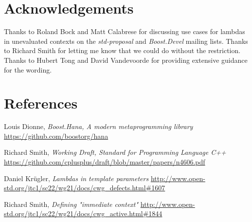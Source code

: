 \documentclass{wg21}
\begin{document}
\section{Acknowledgements}
Thanks to Roland Bock and Matt Calabrese for discussing use cases for lambdas
in unevaluated contexts on the \textit{std-proposal} and \textit{Boost.Devel}
mailing lists. Thanks to Richard Smith for letting me know that we could do
without the restriction. Thanks to Hubert Tong and David Vandevoorde for
providing extensive guidance for the wording.


\section{References}
\renewcommand{\section}[2]{}%
\begin{thebibliography}{9}

    Louis Dionne,
    \emph{Boost.Hana, A modern metaprogramming library}\newline
    \url{https://github.com/boostorg/hana}

    Richard Smith,
    \emph{Working Draft, Standard for Programming Language C++}\newline
    \url{https://github.com/cplusplus/draft/blob/master/papers/n4606.pdf}

    Daniel Kr{\"u}gler,
    \emph{Lambdas in template parameters}\newline
    \url{http://www.open-std.org/jtc1/sc22/wg21/docs/cwg_defects.html#1607}

    Richard Smith,
    \emph{Defining "immediate context"}\newline
    \url{http://www.open-std.org/jtc1/sc22/wg21/docs/cwg_active.html#1844}

\end{thebibliography}
\end{document}
